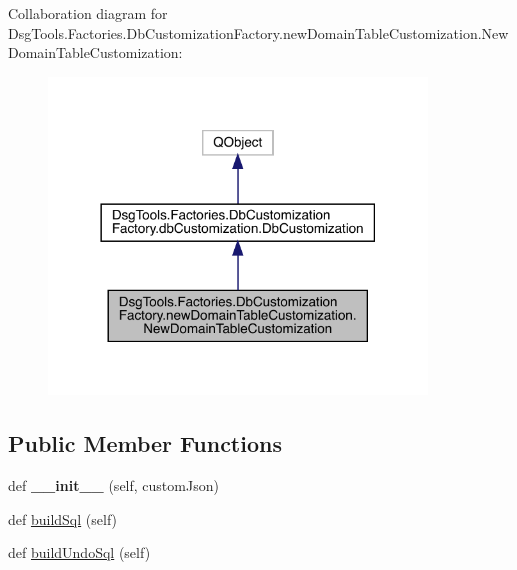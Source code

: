 Collaboration diagram for Dsg\+Tools.\+Factories.\+Db\+Customization\+Factory.\+new\+Domain\+Table\+Customization.\+New\+Domain\+Table\+Customization\+:
\nopagebreak
\begin{figure}[H]
\begin{center}
\leavevmode
\includegraphics[width=285pt]{class_dsg_tools_1_1_factories_1_1_db_customization_factory_1_1new_domain_table_customization_1_19314f5769f33ada00896226c4591dc11}
\end{center}
\end{figure}
\subsection*{Public Member Functions}
\begin{DoxyCompactItemize}
\item 
\mbox{\label{class_dsg_tools_1_1_factories_1_1_db_customization_factory_1_1new_domain_table_customization_1_1_new_domain_table_customization_a691d08636b34dd78e0faf8d6148804e1}} 
def {\bfseries \+\_\+\+\_\+init\+\_\+\+\_\+} (self, custom\+Json)
\item 
def \mbox{\hyperlink{class_dsg_tools_1_1_factories_1_1_db_customization_factory_1_1new_domain_table_customization_1_1_new_domain_table_customization_a7f41b4c7dba0611b65ca3b7ddbfeca7f}{build\+Sql}} (self)
\item 
def \mbox{\hyperlink{class_dsg_tools_1_1_factories_1_1_db_customization_factory_1_1new_domain_table_customization_1_1_new_domain_table_customization_a8d56bf39f1f9f67a4fde36e73950c117}{build\+Undo\+Sql}} (self)
\end{DoxyCompactItemize}

